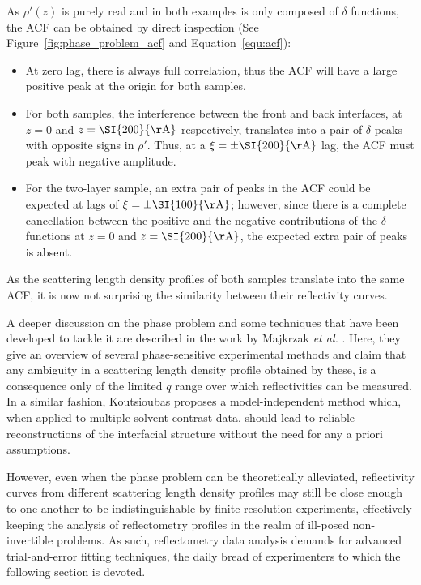 \documentclass[
 reprint,
 superscriptaddress,
 amsmath,amssymb,
 aps,
]{revtex4-1}
\newcommand{\angstrom}{\rm{\AA}}
\begin{document}
As $\rho'(z)$ is purely real and in both examples is only composed of $\delta$ functions, the ACF can be obtained by direct inspection (See Figure~\ref{fig:phase_problem_acf} and Equation~\ref{equ:acf}):
\begin{itemize}
    \item At zero lag, there is always full correlation, thus the ACF will have a large positive peak at the origin for both samples.
    \item For both samples, the interference between the front and back interfaces, at $z = 0$ and $z = \SI{200}{\angstrom}$ respectively, translates into a pair of $\delta$ peaks with opposite signs in $\rho'$. Thus, at a $\xi = \pm \SI{200}{\angstrom}$ lag, the ACF must peak with negative amplitude.
    \item For the two-layer sample, an extra pair of peaks in the ACF could be expected at lags of $\xi = \pm \SI{100}{\angstrom}$; however, since there is a complete cancellation between the positive and the negative contributions of the $\delta$ functions at $z = 0$ and $z = \SI{200}{\angstrom}$, the expected extra pair of peaks is absent.
\end{itemize}
As the scattering length density profiles of both samples translate into the same ACF, it is now not surprising the similarity between their reflectivity curves.

A deeper discussion on the phase problem and some techniques that have been developed to tackle it are described in the work by Majkrzak \emph{et al.} \cite{majkrzak_phase_2003}. Here, they give an overview of several phase-sensitive experimental methods and claim that any ambiguity in a scattering length density profile obtained by these, is a consequence only of the limited $q$ range over which reflectivities can be measured.
In a similar fashion, Koutsioubas \cite{koutsioubas_model_2019} proposes a model-independent method which, when applied to multiple solvent contrast data, should lead to reliable reconstructions of the interfacial structure without the need for any a priori assumptions.

However, even when the phase problem can be theoretically alleviated, reflectivity curves from different scattering length density profiles may still be close enough to one another to be indistinguishable by finite-resolution experiments, effectively keeping the analysis of reflectometry profiles in the realm of ill-posed non-invertible problems.
As such, reflectometry data analysis demands for advanced trial-and-error fitting techniques, the daily bread of experimenters to which the following section is devoted.
\end{document}
